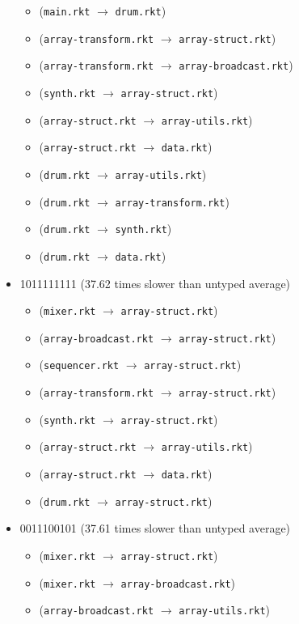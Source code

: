 \documentclass{article}
\newcommand{\mono}[1]{\texttt{#1}}
\begin{document}
\begin{itemize}
\begin{itemize}
  \item (\mono{main.rkt} $\rightarrow$ \mono{drum.rkt})
  \item (\mono{array-transform.rkt} $\rightarrow$ \mono{array-struct.rkt})
  \item (\mono{array-transform.rkt} $\rightarrow$ \mono{array-broadcast.rkt})
  \item (\mono{synth.rkt} $\rightarrow$ \mono{array-struct.rkt})
  \item (\mono{array-struct.rkt} $\rightarrow$ \mono{array-utils.rkt})
  \item (\mono{array-struct.rkt} $\rightarrow$ \mono{data.rkt})
  \item (\mono{drum.rkt} $\rightarrow$ \mono{array-utils.rkt})
  \item (\mono{drum.rkt} $\rightarrow$ \mono{array-transform.rkt})
  \item (\mono{drum.rkt} $\rightarrow$ \mono{synth.rkt})
  \item (\mono{drum.rkt} $\rightarrow$ \mono{data.rkt})
  \end{itemize}
\item 1011111111 (37.62 times slower than untyped average)
  \begin{itemize}
  \item (\mono{mixer.rkt} $\rightarrow$ \mono{array-struct.rkt})
  \item (\mono{array-broadcast.rkt} $\rightarrow$ \mono{array-struct.rkt})
  \item (\mono{sequencer.rkt} $\rightarrow$ \mono{array-struct.rkt})
  \item (\mono{array-transform.rkt} $\rightarrow$ \mono{array-struct.rkt})
  \item (\mono{synth.rkt} $\rightarrow$ \mono{array-struct.rkt})
  \item (\mono{array-struct.rkt} $\rightarrow$ \mono{array-utils.rkt})
  \item (\mono{array-struct.rkt} $\rightarrow$ \mono{data.rkt})
  \item (\mono{drum.rkt} $\rightarrow$ \mono{array-struct.rkt})
  \end{itemize}
\item 0011100101 (37.61 times slower than untyped average)
  \begin{itemize}
  \item (\mono{mixer.rkt} $\rightarrow$ \mono{array-struct.rkt})
  \item (\mono{mixer.rkt} $\rightarrow$ \mono{array-broadcast.rkt})
  \item (\mono{array-broadcast.rkt} $\rightarrow$ \mono{array-utils.rkt})

\end{itemize}
\end{itemize}
\end{document}
